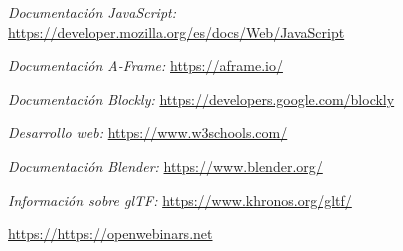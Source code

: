\begin{thebibliography}{0}

    \textit{Documentación JavaScript: }
    \url{https://developer.mozilla.org/es/docs/Web/JavaScript}
    
    \textit{Documentación A-Frame:}
    \url{https://aframe.io/}
    
    \textit{Documentación Blockly:}
    \url{https://developers.google.com/blockly}
    
    \textit{Desarrollo web:}
    \url{https://www.w3schools.com/}
    
    \textit{Documentación Blender:}
    \url{https://www.blender.org/}
    
    \textit{Información sobre glTF:}
    \url{https://www.khronos.org/gltf/}
    
    \url{https://https://openwebinars.net}
    



\end{thebibliography}